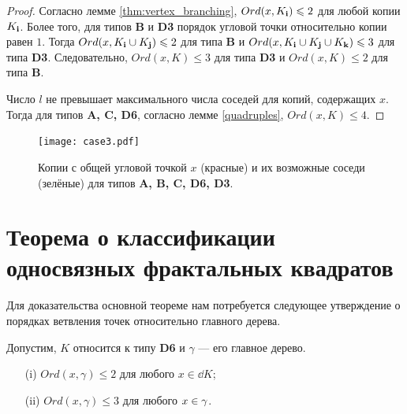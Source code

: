\begin{proof}
Согласно лемме \ref{thm:vertex_branching}, $Ord(x,K_{\bf{i}})\leqslant2$ для любой копии $K_{\bf{i}}$.
Более того, для типов \textbf{B} и \textbf{D3} порядок угловой точки относительно копии равен $1$.
Тогда $Ord(x,K_{\bf{i}}\cup K_{\bf{j}})\leqslant2$ для типа \textbf{B} и $Ord(x,K_{\bf{i}}\cup K_{\bf{j}}\cup K_{\bf{k}})\leqslant3$ для типа \textbf{D3}.
Следовательно, $Ord(x,K)\leq3$ для типа {\bf D3} и $Ord(x,K)\leq2$ для типа {\bf B}.

Число $l$ не превышает максимального числа соседей для копий, содержащих $x$.
Тогда для типов {\bf A, C, D6}, согласно лемме \ref{quadruples}, $Ord(x,K)\leq4$.
\end{proof}

\begin{figure}[H]
\centering
\texttt{[image: case3.pdf]}
\caption{Копии с общей угловой точкой $x$ (красные) и их возможные соседи (зелёные) для типов {\bf A, B, C, D6, D3}.}
\label{fig:case3}
\end{figure}


\section{Теорема о классификации односвязных фрактальных квадратов}

Для доказательства основной теореме нам потребуется следующее утверждение о порядках ветвления точек относительно главного дерева.

\begin{proposition}\label{lem:d4bound}
Допустим, $K$ относится к типу {\bf D6} и $\gamma$ --- его главное дерево.
\begin{itemize}[nolistsep]
    \item[(i)] $Ord(x,\gamma)\leq2$ для любого $x\in\dd K$;
    \item[(ii)] $Ord(x,\gamma)\leq3$ для любого $x\in\gamma$.
\end{itemize}
\end{proposition}



